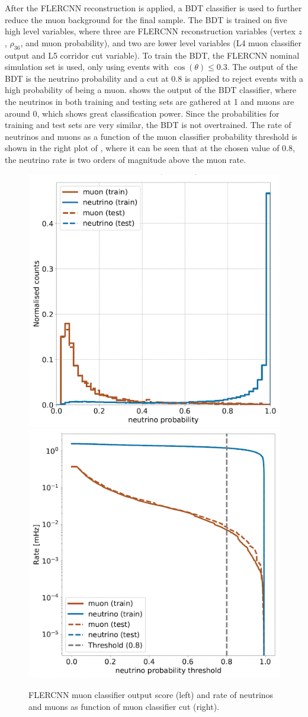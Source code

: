After the FLERCNN reconstruction is applied, a BDT classifier is used to further reduce the muon background for the final sample. The BDT is trained on five high level variables, where three are FLERCNN reconstruction variables (vertex $z$, $\rho_{36}$, and muon probability), and two are lower level variables (L4 muon classifier output and L5 corridor cut variable). To train the BDT, the FLERCNN nominal simulation set is used, only using events with $\cos(\theta)\leq 0.3$. The output of the BDT is the neutrino probability and a cut at 0.8 is applied to reject events with a high probability of being a muon.  shows the output of the BDT classifier, where the neutrinos in both training and testing sets are gathered at 1 and muons are around 0, which shows great classification power. Since the probabilities for training and test sets are very similar, the BDT is not overtrained. The rate of neutrinos and muons as a function of the muon classifier probability threshold is shown in the right plot of , where it can be seen that at the chosen value of 0.8, the neutrino rate is two orders of magnitude above the muon rate.

\begin{figure}
\includegraphics[width=0.49\linewidth]{figures/simulation_and_processing/flercnn/flercnn_muon_classifier.png}
\includegraphics[width=0.49\linewidth]{figures/simulation_and_processing/flercnn/flercnn_muon_classifier_rate_vs_threshold.png}
\caption[FLERCNN muon classifier probability distributions]{FLERCNN muon classifier output score (left) and rate of neutrinos and muons as function of muon classifier cut (right).}
\end{figure}

